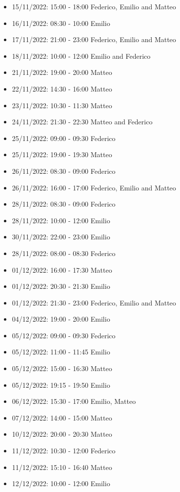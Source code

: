 \begin{itemize}
    \item 15/11/2022: 15:00 - 18:00 Federico, Emilio and Matteo
    \item 16/11/2022: 08:30 - 10:00 Emilio
    \item 17/11/2022: 21:00 - 23:00 Federico, Emilio and Matteo
    \item 18/11/2022: 10:00 - 12:00 Emilio and Federico
    \item 21/11/2022: 19:00 - 20:00 Matteo
    \item 22/11/2022: 14:30 - 16:00 Matteo
    \item 23/11/2022: 10:30 - 11:30 Matteo
    \item 24/11/2022: 21:30 - 22:30 Matteo and Federico
    \item 25/11/2022: 09:00 - 09:30 Federico
    \item 25/11/2022: 19:00 - 19:30 Matteo
    \item 26/11/2022: 08:30 - 09:00 Federico
    \item 26/11/2022: 16:00 - 17:00 Federico, Emilio and Matteo
    \item 28/11/2022: 08:30 - 09:00 Federico
    \item 28/11/2022: 10:00 - 12:00 Emilio
    \item 30/11/2022: 22:00 - 23:00 Emilio
    \item 28/11/2022: 08:00 - 08:30 Federico
    \item 01/12/2022: 16:00 - 17:30 Matteo
    \item 01/12/2022: 20:30 - 21:30 Emilio
    \item 01/12/2022: 21:30 - 23:00 Federico, Emilio and Matteo
    \item 04/12/2022: 19:00 - 20:00 Emilio
    \item 05/12/2022: 09:00 - 09:30 Federico
    \item 05/12/2022: 11:00 - 11:45 Emilio
    \item 05/12/2022: 15:00 - 16:30 Matteo
    \item 05/12/2022: 19:15 - 19:50 Emilio
    \item 06/12/2022: 15:30 - 17:00 Emilio, Matteo
    \item 07/12/2022: 14:00 - 15:00 Matteo
    \item 10/12/2022: 20:00 - 20:30 Matteo
    \item 11/12/2022: 10:30 - 12:00 Federico
    \item 11/12/2022: 15:10 - 16:40 Matteo
    \item 12/12/2022: 10:00 - 12:00 Emilio

\end{itemize}
